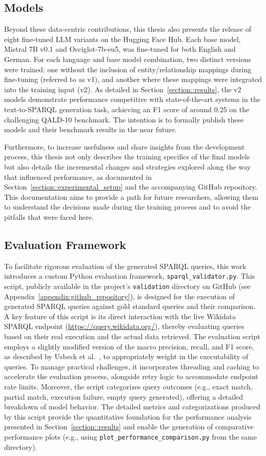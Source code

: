 \subsection{Models}
Beyond these data-centric contributions, this thesis also presents the release of eight fine-tuned LLM variants on the Hugging Face Hub. 
Each base model, Mistral 7B v0.1 and Occiglot-7b-eu5, was fine-tuned for both English and German.
For each language and base model combination, two distinct versions were trained: one without the inclusion of entity/relationship mappings during fine-tuning (referred to as v1), and another where these mappings were integrated into the training input (v2).
As detailed in Section~\ref{section::results}, the v2 models demonstrate performance competitive with state-of-the-art systems in the text-to-SPARQL generation task, achieving an F1 score of around 0.25 on the challenging QALD-10 benchmark.
The intention is to formally publish these models and their benchmark results in the near future.

Furthermore, to increase usefulness and share insights from the development process, this thesis not only describes the training specifics of the final models but also details the incremental changes and strategies explored along the way that influenced performance, as documented in Section~\ref{section::experimental_setup} and the accompanying GitHub repository.
This documentation aims to provide a path for future researchers, allowing them to understand the decisions made during the training process and to avoid the pitfalls that were faced here.

\subsection{Evaluation Framework}
To facilitate rigorous evaluation of the generated SPARQL queries, this work introduces a custom Python evaluation framework, \texttt{sparql\_validator.py}.
This script, publicly available in the project's \texttt{validation} directory on GitHub (see Appendix~\ref{appendix:github_repository}), is designed for the execution of generated SPARQL queries against gold standard queries and their comparison.
A key feature of this script is its direct interaction with the live Wikidata SPARQL endpoint (\url{https://query.wikidata.org/}), thereby evaluating queries based on their real execution and the actual data retrieved.
The evaluation script employs a slightly modified version of the macro precision, recall, and F1 score, as described by Usbeck et al.~\cite{usbeck2019benchmarking}, to appropriately weight in the executability of queries.
To manage practical challenges, it incorporates threading and caching to accelerate the evaluation process, alongside retry logic to accommodate endpoint rate limits.
Moreover, the script categorizes query outcomes (e.g., exact match, partial match, execution failure, empty query generated), offering a detailed breakdown of model behavior.
The detailed metrics and categorizations produced by this script provide the quantitative foundation for the performance analysis presented in Section~\ref{section::results} and enable the generation of comparative performance plots (e.g., using \texttt{plot\_performance\_comparison.py} from the same directory).

